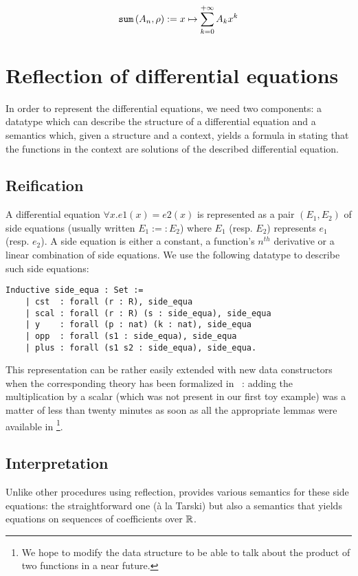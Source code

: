 \documentclass{article}
\begin{document}
$$\operatorname{\mathtt{sum}}{}(A_n, \rho) := x \mapsto \sum_{k=0}^{+ \infty} A_k x^k$$

\section{Reflection of differential equations}

In order to represent the differential equations, we need two components: a
datatype which can describe the structure of a differential equation and a
semantics which, given a structure and a context, yields a formula in
\Prop{} stating that the functions in the context are solutions of the
described differential equation.

\subsection{Reification}

A differential equation $\forall x. e1(x) = e2(x)$ is represented as a pair
$(E_1, E_2)$ of side equations (usually written $E_1 :=: E_2$) where $E_1$ (resp.
$E_2$) represents $e_1$ (resp. $e_2$). A side equation is either a constant,
a function's $n^{th}$ derivative or a linear combination of side equations. We
use the following datatype to describe such side equations:


\begin{verbatim}
Inductive side_equa : Set :=
    | cst  : forall (r : R), side_equa
    | scal : forall (r : R) (s : side_equa), side_equa
    | y    : forall (p : nat) (k : nat), side_equa
    | opp  : forall (s1 : side_equa), side_equa
    | plus : forall (s1 s2 : side_equa), side_equa.
\end{verbatim}

This representation can be rather easily extended with new data constructors
when the corresponding theory has been formalized in \coq{}~\cite{coq}: adding
the multiplication by a scalar (which was not present in our first toy example)
was a matter of less than twenty minutes as soon as all the appropriate lemmas
were available in \Rpser{}\footnote{We hope to modify the data structure to be
able to talk about the product of two functions in a near future.}.

\subsection{Interpretation}

Unlike other procedures using reflection, \dequa{} provides various semantics for
these side equations: the straightforward one (\`a la Tarski) but also a semantics
that yields equations on sequences of coefficients over $\mathbb{R}$.
\end{document}

